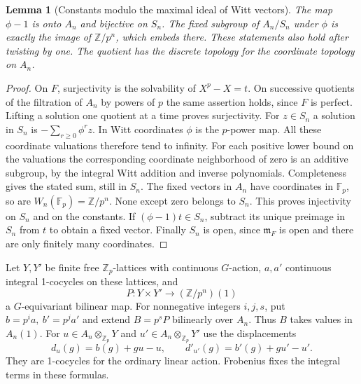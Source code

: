\documentclass[a4paper,11pt]{article}
\newtheorem{lemma}[proposition]{Lemma}
\theoremstyle{definition}
\theoremstyle{remark}
\newcommand{\ZZ}{\mathbb Z}\newcommand{\ord}{\operatorname{ord}}
\numberwithin{equation}{section}
\begin{document}
\begin{lemma}[Constants modulo the maximal ideal of Witt vectors]
\leavevmode\label{lem:wittconstants757}
The map \(\phi-1\) is onto \(A_n\) and bijective on \(S_n\).
The fixed subgroup of \(A_n/S_n\) under \(\phi\) is exactly the
image of \(\ZZ/p^n\), which embeds there. These statements also
hold after twisting by one. The quotient has the discrete
topology for the coordinate topology on \(A_n\).
\end{lemma}
\begin{proof}
On \(F\), surjectivity is the solvability of \(X^p-X=t\).
On successive quotients of the filtration of \(A_n\) by powers
of \(p\) the same assertion holds, since \(F\) is perfect.
Lifting a solution one quotient at a time proves surjectivity.
For \(z\in S_n\) a solution in \(S_n\) is
\(-\sum_{r\ge0}\phi^r z\). In Witt coordinates \(\phi\) is
the \(p\)-power map. All these coordinate valuations therefore
tend to infinity. For each positive lower bound on the
valuations the corresponding coordinate neighborhood of zero
is an additive subgroup, by the integral Witt addition and
inverse polynomials. Completeness gives the stated sum, still
in \(S_n\). The fixed vectors in \(A_n\) have coordinates
in \(\mathbb F_p\), so are \(W_n(\mathbb F_p)=\ZZ/p^n\).
None except zero belongs to \(S_n\). This proves injectivity
on \(S_n\) and on the constants. If \((\phi-1)t\in S_n\),
subtract its unique preimage in \(S_n\) from \(t\) to obtain
a fixed vector. Finally \(S_n\) is open, since \(\mathfrak m_F\)
is open and there are only finitely many coordinates.
\end{proof}

Let \(Y,Y'\) be finite free \(\ZZ_p\)-lattices with continuous
\(G\)-action, \(a,a'\) continuous integral 1-cocycles on these
lattices, and
\[
                P:Y\times Y'\longrightarrow(\ZZ/p^n)(1)
\]
a \(G\)-equivariant bilinear map. For nonnegative integers
\(i,j,s\), put \(b=p^ia,\ b'=p^ja'\) and extend \(B=p^sP\)
bilinearly over \(A_n\). Thus \(B\) takes values in \(A_n(1)\).
For \(u\in A_n\otimes_{\ZZ_p}Y\) and
\(u'\in A_n\otimes_{\ZZ_p}Y'\) use the displacements
\[
 d_u(g)=b(g)+gu-u,\qquad d'_{u'}(g)=b'(g)+gu'-u'.
\]
They are 1-cocycles for the ordinary linear action. Frobenius
fixes the integral terms in these formulas.
\end{document}
